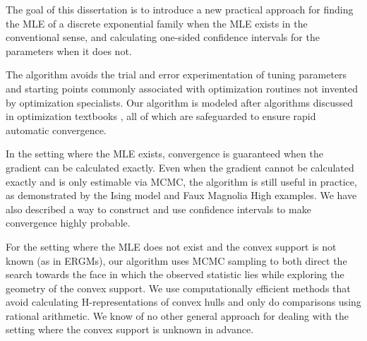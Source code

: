 The goal of this dissertation is to introduce a new practical approach
for finding the MLE of a discrete exponential family when the MLE exists
in the conventional sense,
and calculating one-sided confidence intervals for the parameters when it does not.

The algorithm avoids the trial and error experimentation of tuning parameters 
and starting points commonly associated with optimization routines
not invented by optimization specialists.  Our algorithm is modeled after algorithms 
discussed in optimization textbooks \citep{Fletcher,NW,Sun:2006},
all of which are safeguarded to ensure rapid automatic convergence.

In the setting where the MLE exists, convergence is guaranteed when the gradient 
can be calculated exactly.  Even when the 
gradient cannot be calculated 
exactly and is only estimable via MCMC, the algorithm is still useful in practice, as 
demonstrated by the Ising model and Faux Magnolia High
examples.  We have also described a way to construct and use confidence intervals to 
make convergence highly probable.

For the setting where the MLE does not exist and the convex support is 
not known (as in ERGMs), our algorithm uses MCMC sampling to
both direct the search towards the face in which the observed statistic lies
while exploring the geometry of the convex support.  We use
computationally efficient methods that avoid calculating H-representations
of convex hulls and only do comparisons using rational arithmetic.
We know of no other general approach for dealing with the setting where
the convex support is unknown in advance.

